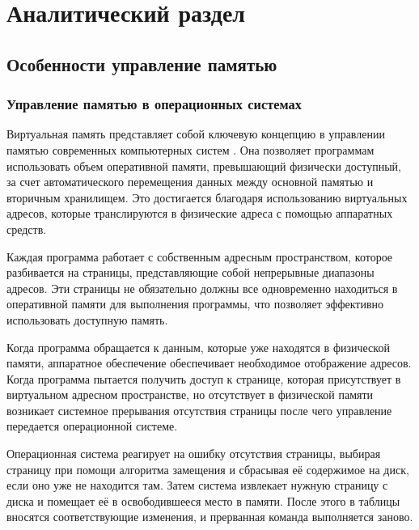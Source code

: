 \chapter{Аналитический раздел}

\section{Особенности управление памятью}

\subsection{Управление памятью в операционных системах}

Виртуальная память представляет собой ключевую концепцию в управлении памятью современных компьютерных систем \cite{noor202512}.
Она позволяет программам использовать объем оперативной памяти, превышающий физически доступный, за счет автоматического перемещения данных между основной памятью
и вторичным хранилищем.
Это достигается благодаря использованию виртуальных адресов, которые транслируются в физические адреса с помощью аппаратных средств.

Каждая программа работает с собственным адресным пространством, которое разбивается на страницы, представляющие собой непрерывные диапазоны адресов.
Эти страницы не обязательно должны все одновременно находиться в оперативной памяти для выполнения программы, что позволяет эффективно использовать доступную память.

Когда программа обращается к данным, которые уже находятся в физической памяти, аппаратное обеспечение обеспечивает необходимое отображение адресов.
Когда программа пытается получить доступ к странице, которая присутствует в виртуальном адресном пространстве, но отсутствует в физической памяти возникает системное прерывания отсутствия страницы после чего управление передается операционной системе.

Операционная система реагирует на ошибку отсутствия страницы, выбирая страницу при помощи алгоритма замещения и сбрасывая её содержимое на диск, если оно уже не находится там. 
Затем система извлекает нужную страницу с диска и помещает её в освободившееся место в памяти. 
После этого в таблицы вносятся соответствующие изменения, и прерванная команда выполняется заново.

